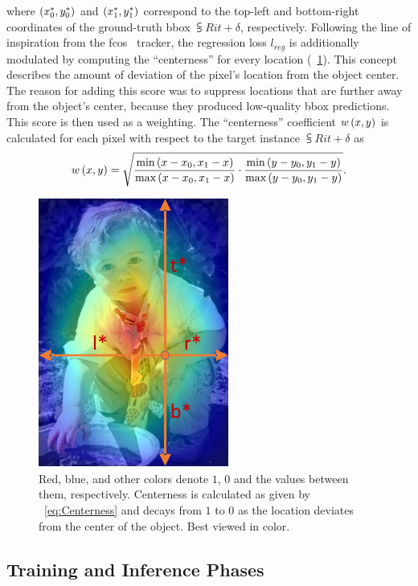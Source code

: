 where $\left( {{x}_{0}^{*}, {y}_{0}^{*}} \right)$ and $\left( {{x}_{1}^{*}, {y}_{1}^{*}} \right)$ correspond to the top-left and bottom-right coordinates of the ground-truth \gls{bbox} $\subsup{R}{i}{t + \delta}$, respectively. Following the line of inspiration from the \gls{fcos}~\cite{tian2019fcos} tracker, the regression loss $l_{reg}$ is additionally modulated by computing the ``centerness'' for every location (\figtext{}~\ref{fig:FCOSCenterness}). This concept describes the amount of deviation of the pixel's location from the object center. The reason for adding this score was to suppress locations that are further away from the object's center, because they produced low-quality \gls{bbox} predictions. This score is then used as a weighting. The ``centerness'' coefficient ${w} \left( x, y \right)$ is calculated for each pixel with respect to the target instance $\subsup{R}{i}{t + \delta}$ as
\begin{equation}
    \label{eq:Centerness}
    {w} \left( x, y \right) =
    \sqrt{
        \frac{\text{min} \left( x - x_0, x_1 - x \right)}{\text{max} \left( x - x_0, x_1 - x \right)}
        \cdot
        \frac{\text{min} \left( y - y_0, y_1 - y \right)}{\text{max} \left( y - y_0, y_1 - y \right)}
    }.
\end{equation}

\begin{figure}[t]
    \centerline{\includegraphics[width=0.2\linewidth]{figures/siamese_tracking/fcos_centerness.pdf}}
    \caption[Centerness visualization]{Red, blue, and other colors denote $1$, $0$ and the values between them, respectively. Centerness is calculated as given by \eqtext{}~\ref{eq:Centerness} and decays from $1$ to $0$ as the location deviates from the center of the object. Best viewed in color. }
    \label{fig:FCOSCenterness}
\end{figure}

\subsection{Training and Inference Phases}

